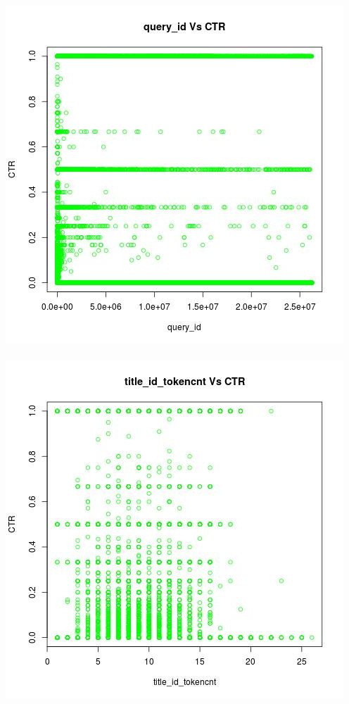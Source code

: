 \documentclass[10pt]{article}
\begin{document}
\includegraphics[scale=0.5]{query_id_Vs_CTR}\\\\
\includegraphics[scale=0.5]{title_id_tokencnt_Vs_CTR}
\end{document}
